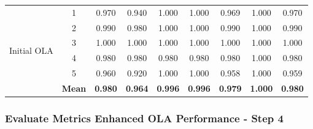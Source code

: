 \documentclass[conference]{IEEEtran}
\begin{document}
\begin{table}[H]
{\begin{tabular}{|l|c|c|c|c|c|c|c|c|}
\hline
\multirow{6}{*}{Initial OLA} 
& 1 & 0.970 & 0.940 & 1.000 & 1.000 & 0.969 & 1.000 & 0.970 \\
& 2 & 0.990 & 0.980 & 1.000 & 1.000 & 0.990 & 1.000 & 0.990 \\
& 3 & 1.000 & 1.000 & 1.000 & 1.000 & 1.000 & 1.000 & 1.000 \\
& 4 & 0.980 & 0.980 & 0.980 & 0.980 & 0.980 & 1.000 & 0.980 \\
& 5 & 0.960 & 0.920 & 1.000 & 1.000 & 0.958 & 1.000 & 0.959 \\
& \textbf{Mean} & \textbf{0.980} & \textbf{0.964} & \textbf{0.996} & \textbf{0.996} & \textbf{0.979} & \textbf{1.000} & \textbf{0.980} \\
\hline
\end{tabular}}
\end{table}


\subsubsection{Evaluate Metrics Enhanced OLA Performance - Step 4}\mbox{}\\

\begin{table}[H]
\centering
\caption{Single-run performance of models on the private dataset with enhanced OLA (PCA + OLA with TiepXucMat control).}
\label{tab:enhanced_ola_single_run}
\end{table}
\end{document}
